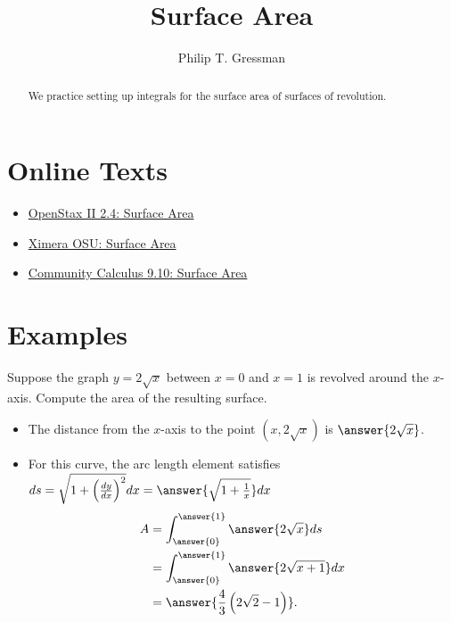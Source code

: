 \documentclass{ximera}
\title{Surface Area}
\author{Philip T. Gressman}
\begin{document}
\begin{abstract}
We practice setting up integrals for the surface area of surfaces of revolution.
\end{abstract}
\maketitle

\section*{Online Texts}
\begin{itemize}
\item \href{https://openstax.org/books/calculus-volume-2/pages/2-4-arc-length-of-a-curve-and-surface-area}{OpenStax II 2.4: Surface Area}
\item \href{https://ximera.osu.edu/mooculus/calculus2/surfaceArea/titlePage}{Ximera OSU: Surface Area}
\item \href{https://www.whitman.edu/mathematics/calculus_online/section09.10.html}{Community Calculus 9.10: Surface Area}
\end{itemize}

\section*{Examples}

\begin{example}
Suppose the graph $y = 2\sqrt{x}$ between $x = 0$ and $x = 1$ is revolved around the $x$-axis. Compute the area of the resulting surface.
\begin{itemize}
\item The distance from the $x$-axis to the point $(x,2\sqrt{x})$ is $\answer{2 \sqrt{x}}$.
\item For this curve, the arc length element satisfies $ds = \sqrt{1 + \left( \frac{dy}{dx} \right)^2} dx = \answer{\sqrt{1 + \frac{1}{x}}} dx$
\[ \begin{aligned} A & = \int_{\answer{0}}^{\answer{1}} \answer{2\sqrt{x}} ds \\
& = \int_{\answer{0}}^{\answer{1}} \answer{2 \sqrt{x+1}} dx \\
&= \answer{\frac{4}{3} \left( 2\sqrt{2} - 1 \right)}.
\end{aligned} \]
\end{itemize}
\end{example}
\end{document}
